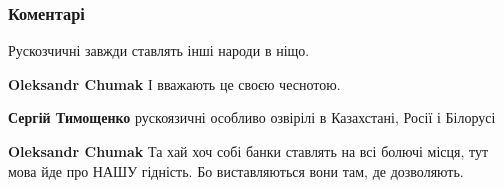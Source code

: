  
 
 
 
 
\subsubsection{Коментарі}

\begin{itemize}
 
Рускозчичні завжди ставлять інші народи в ніщо.

\begin{itemize}

 
\textbf{Oleksandr Chumak} І вважають це своєю чеснотою.

 
\textbf{Сергій Тимощенко} рускоязичні особливо озвірілі в Казахстані, Росії і Білорусі

 
\textbf{Oleksandr Chumak} Та хай хоч собі банки ставлять на всі болючі місця,
тут мова йде про НАШУ гідність. Бо виставляються вони там, де дозволяють.

 

\end{itemize}
\end{itemize}

